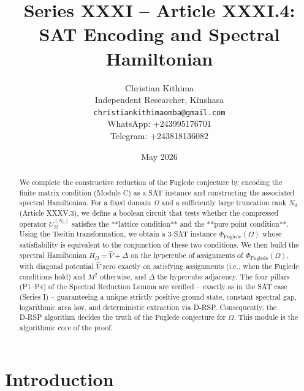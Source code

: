 \documentclass[11pt,a4paper]{article}
\title{Series XXXI – Article XXXI.4: SAT Encoding and Spectral Hamiltonian}
\author{Christian Kithima \\
Independent Researcher, Kinshasa \\
\texttt{christiankithimaomba@gmail.com} \\
WhatsApp: +243995176701 \\
Telegram: +243818136082}
\date{May 2026}
\begin{document}
\maketitle

\begin{abstract}
We complete the constructive reduction of the Fuglede conjecture by encoding the finite matrix condition (Module C) as a SAT instance and constructing the associated spectral Hamiltonian. For a fixed domain $\Omega$ and a sufficiently large truncation rank $N_0$ (Article XXXV.3), we define a boolean circuit that tests whether the compressed operator $U_\Omega^{(N_0)}$ satisfies the **lattice condition** and the **pure point condition**. Using the Tseitin transformation, we obtain a 3‑SAT instance $\Phi_{\text{Fuglede}}(\Omega)$ whose satisfiability is equivalent to the conjunction of these two conditions. We then build the spectral Hamiltonian $H_\Omega = \hat{V} + \Delta$ on the hypercube of assignments of $\Phi_{\text{Fuglede}}(\Omega)$, with diagonal potential $\hat{V}$ zero exactly on satisfying assignments (i.e., when the Fuglede conditions hold) and $M^2$ otherwise, and $\Delta$ the hypercube adjacency. The four pillars (P1–P4) of the Spectral Reduction Lemma are verified – exactly as in the SAT case (Series I) – guaranteeing a unique strictly positive ground state, constant spectral gap, logarithmic area law, and deterministic extraction via D‑RSP. Consequently, the D‑RSP algorithm decides the truth of the Fuglede conjecture for $\Omega$. This module is the algorithmic core of the proof.
\end{abstract}

\tableofcontents

\section{Introduction}
\end{document}
